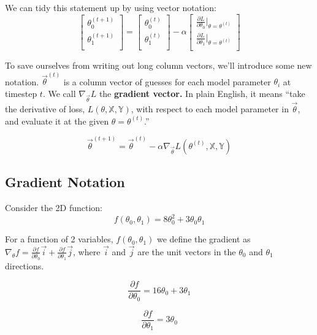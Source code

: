\documentclass[
  letterpaper,
  DIV=11,
  numbers=noendperiod]{scrreprt}
\begin{document}
We can tidy this statement up by using vector notation:
\[\begin{bmatrix}
           \theta_{0}^{(t+1)} \\
           \theta_{1}^{(t+1)} \\
         \end{bmatrix}
=
\begin{bmatrix}
           \theta_{0}^{(t)} \\
           \theta_{1}^{(t)} \\
         \end{bmatrix}
- \alpha
\begin{bmatrix}
           \frac{\partial L}{\partial \theta_{0}}\vert_{\theta=\theta^{(t)}} \\
           \frac{\partial L}{\partial \theta_{1}}\vert_{\theta=\theta^{(t)}} \\
         \end{bmatrix}
\]

To save ourselves from writing out long column vectors, we'll introduce
some new notation. \(\vec{\theta}^{(t)}\) is a column vector of guesses
for each model parameter \(\theta_i\) at timestep \(t\). We call
\(\nabla_{\vec{\theta}} L\) the \textbf{gradient vector.} In plain
English, it means ``take the derivative of loss,
\(L(\theta, \mathbb{X}, \mathbb{Y})\), with respect to each model
parameter in \(\vec{\theta}\), and evaluate it at the given
\(\theta = \theta^{(t)}\).''

\[\vec{\theta}^{(t+1)}
= \vec{\theta}^{(t)} - \alpha \nabla_{\vec{\theta}} L(\theta^{(t)}, \mathbb{X}, \mathbb{Y})
\]

\hypertarget{gradient-notation}{%
\subsection{Gradient Notation}\label{gradient-notation}}

Consider the 2D function:
\[f(\theta_0, \theta_1) = 8\theta_0^2 + 3\theta_0\theta_1\]

For a function of 2 variables, \(f(\theta_0, \theta_1)\) we define the
gradient as
\(\nabla_\theta f = \frac{\partial f}{\partial \theta_0} \vec{i} + \frac{\partial f}{\partial \theta_1} \vec{j}\),
where \(\vec{i}\) and \(\vec{j}\) are the unit vectors in the
\(\theta_0\) and \(\theta_1\) directions.

\[\frac{\partial f}{\partial \theta_0} = 16\theta_0 + 3\theta_1\]

\[\frac{\partial f}{\partial \theta_1} = 3\theta_0\]
\end{document}

